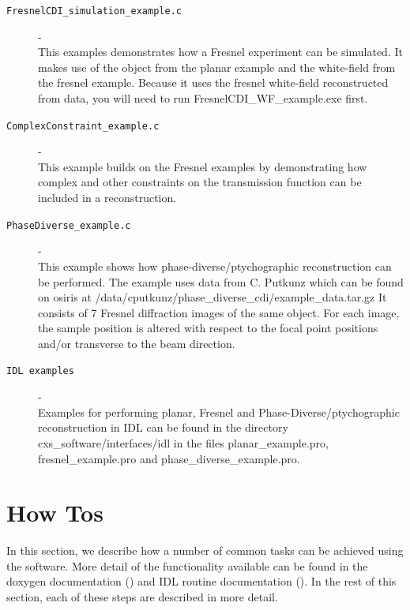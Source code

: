 \documentclass[]{cxs-software}
\begin{document}
\begin{description}
\item[{\tt FresnelCDI\_simulation\_example.c }]- \\ This examples
  demonstrates how a Fresnel experiment can be simulated. It makes use
  of the object from the planar example and the white-field from the
  fresnel example. Because it uses the fresnel white-field
  reconstructed from data, you will need to run
  FresnelCDI\_WF\_example.exe first.

\item[{\tt ComplexConstraint\_example.c }]- \\ This example builds on
  the Fresnel examples by demonstrating how complex and other
  constraints on the transmission function can be included in a
  reconstruction.

\item[{\tt PhaseDiverse\_example.c }]- \\ This example shows how
  phase-diverse/ptychographic reconstruction can be performed. The
  example uses data from C. Putkunz which can be found on osiris at
  /data/cputkunz/phase\_diverse\_cdi/example\_data.tar.gz It consists
  of 7 Fresnel diffraction images of the same object.  For each image,
  the sample position is altered with respect to the focal point
  positions and/or transverse to the beam direction.

\item[{\tt IDL examples}] - \\ Examples for performing planar, Fresnel
  and Phase-Diverse/ptychographic reconstruction in IDL can be found
  in the directory cxs\_software/interfaces/idl in the files
  planar\_example.pro, fresnel\_example.pro and
  phase\_diverse\_example.pro.

\end{description}


\newpage

\section{How Tos}
\label{how to}

In this section, we describe how a number of common tasks can be
achieved using the software. More detail of the functionality
available can be found in the doxygen documentation () and IDL routine
documentation (). In the rest of this section, each of these steps are
described in more detail.
\end{document}
